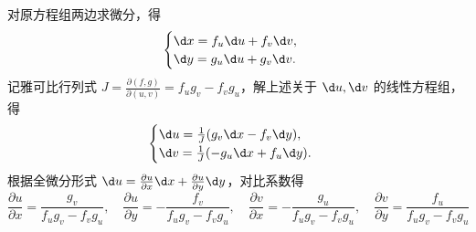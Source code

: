 \begin{solution}

    对原方程组两边求微分，得
    \begin{equation}
        \begin{cases}
            \d x = f_u \d u + f_v \d v, \\
            \d y = g_u \d u + g_v \d v.
        \end{cases}
    \end{equation}
    记雅可比行列式 $J = \frac{\partial(f, g)}{\partial(u, v)} = f_u g_v - f_v g_u$，解上述关于 $\d u, \d v$ 的线性方程组，得
    \begin{equation}
        \begin{cases}
            \d u = \frac{1}{J} (g_v \d x - f_v \d y), \\
            \d v = \frac{1}{J} (-g_u \d x + f_u \d y).
        \end{cases}
    \end{equation}
    根据全微分形式 $\d u = \frac{\partial u}{\partial x} \d x + \frac{\partial u}{\partial y} \d y$，对比系数得
    \begin{equation}
        \boxed{\frac{\partial u}{\partial x} = \frac{g_v}{f_u g_v - f_v g_u}, \quad \frac{\partial u}{\partial y} = -\frac{f_v}{f_u g_v - f_v g_u}, \quad \frac{\partial v}{\partial x} = -\frac{g_u}{f_u g_v - f_v g_u}, \quad \frac{\partial v}{\partial y} = \frac{f_u}{f_u g_v - f_v g_u}}
    \end{equation}



\end{solution}
